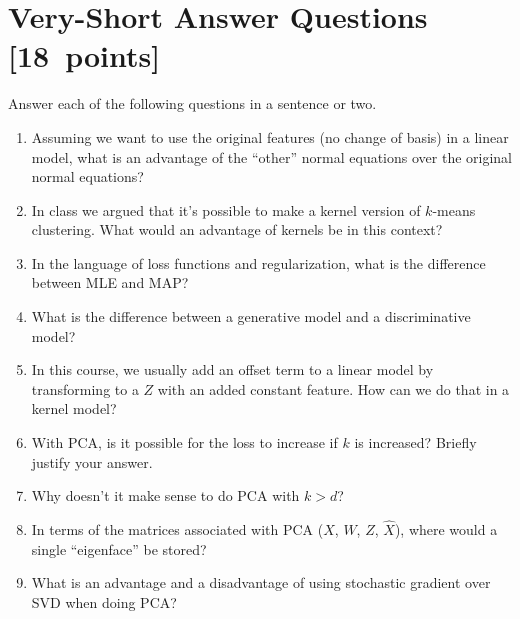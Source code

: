 \documentclass{article}
\newcommand{\blu}[1]{{\textcolor{blu}{#1}}}
\let\ask\blu
\newcommand\pts[1]{\textcolor{pointscolour}{[#1~points]}}
\begin{document}
\clearpage
\section{Very-Short Answer Questions \pts{18}}
\ask{Answer each of the following questions in a sentence or two.}
\begin{enumerate}
\item Assuming we want to use the original features (no change of basis) in a linear model, what is an advantage of the ``other'' normal equations over the original normal equations?

\item In class we argued that it's possible to make a kernel version of $k$-means clustering. What would an advantage of kernels be in this context?

\item In the language of loss functions and regularization, what is the difference between MLE and MAP?

\item What is the difference between a generative model and a discriminative model?

\item In this course, we usually add an offset term to a linear model by transforming to a $Z$ with an added constant feature. How can we do that in a kernel model?

\item With PCA, is it possible for the loss to increase if $k$ is increased? Briefly justify your answer.


\item Why doesn't it make sense to do PCA with $k > d$?

\item In terms of the matrices associated with PCA ($X$, $W$, $Z$, $\hat{X}$), where would a single ``eigenface'' be stored?

\item What is an advantage and a disadvantage of using stochastic gradient over SVD when doing PCA?

\end{enumerate}
\end{document}
